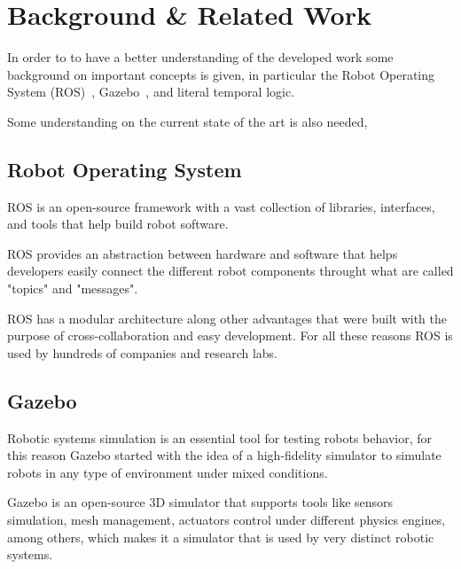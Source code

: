 \chapter{Background \& Related Work}
\label{chap:background}

In order to to have a better understanding of the developed work some background on important concepts is given, in particular the Robot Operating System (ROS)~\cite{Ros}, Gazebo~\cite{Gazebo}, and literal temporal logic.

Some understanding on the current state of the art is also needed,

\section{Robot Operating System}
\label{sec:ros}

ROS is an open-source framework with a vast collection of libraries, interfaces, and tools that help build robot software. 

ROS provides an abstraction between hardware and software that helps developers easily connect the different robot components throught what are called "topics" and "messages".

ROS has a modular architecture along other advantages that were built with the purpose of cross-collaboration and easy development. For all these reasons ROS is used by hundreds of companies and research labs.

\section{Gazebo}
\label{sec:gazebo}

Robotic systems simulation is an essential tool for testing robots behavior, for this reason Gazebo started with the idea of a high-fidelity simulator to simulate robots in any type of environment under mixed conditions.

Gazebo is an open-source 3D simulator that supports tools like sensors simulation, mesh management, actuators control under different physics engines, among others, which makes it a simulator that is used by very distinct robotic systems.

